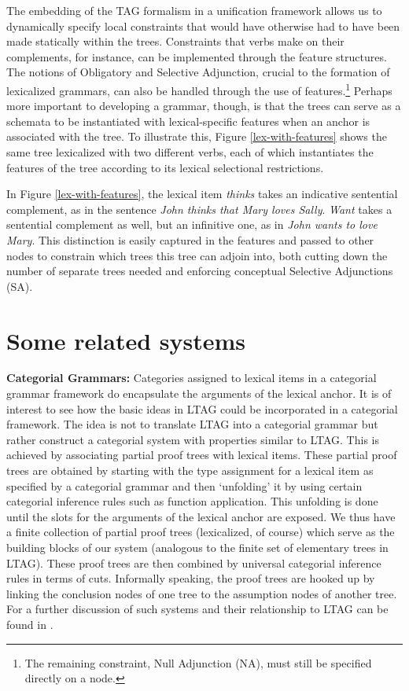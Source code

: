 The embedding of the TAG formalism in a unification framework allows
us to dynamically specify local constraints that would have otherwise
had to have been made statically within the trees.  Constraints that
verbs make on their complements, for instance, can be implemented
through the feature structures.  The notions of Obligatory and
Selective Adjunction, crucial to the formation of lexicalized
grammars, can also be handled through the use of
features.\footnote{The remaining constraint, Null Adjunction (NA),
must still be specified directly on a node.} Perhaps more important to
developing a grammar, though, is that the trees can serve as a
schemata to be instantiated with lexical-specific features when an
anchor is associated with the tree.  To illustrate this, Figure
\ref{lex-with-features} shows the same tree lexicalized with two
different verbs, each of which instantiates the features of the tree
according to its lexical selectional restrictions.

In Figure \ref{lex-with-features}, the lexical item {\it thinks} takes an
indicative sentential complement, as in the sentence {\it John thinks that Mary
loves Sally}.  {\it Want} takes a sentential complement as well, but an
infinitive one, as in {\it John wants to love Mary}.  This distinction is
easily captured in the features and passed to other nodes to constrain which
trees this tree can adjoin into, both cutting down the number of separate trees
needed and enforcing conceptual Selective Adjunctions (SA).

\section{Some related systems}

{\bf Categorial Grammars:} Categories assigned to lexical items in a
categorial grammar framework do encapsulate the arguments of the
lexical anchor. It is of interest to see how the basic ideas in LTAG
could be incorporated in a categorial framework. The idea is not to
translate LTAG into a categorial grammar but rather construct a
categorial system with properties similar to LTAG. This is achieved by
associating partial proof trees with lexical items. These partial
proof trees are obtained by starting with the type assignment for a
lexical item as specified by a categorial grammar and then `unfolding'
it by using certain categorial inference rules such as function
application. This unfolding is done until the slots for the arguments
of the lexical anchor are exposed. We thus have a finite collection of
partial proof trees (lexicalized, of course) which serve as the
building blocks of our system (analogous to the finite set of
elementary trees in LTAG). These proof trees are then combined by
universal categorial inference rules in terms of cuts. Informally
speaking, the proof trees are hooked up by linking the conclusion
nodes of one tree to the assumption nodes of another tree. For a
further discussion of such systems and their relationship to LTAG can
be found in \cite{JoshiKulick97,joshi99:_proof_trees}.

